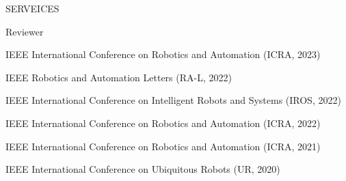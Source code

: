 \begin{rSection}{SERVEICES}{}{}{}        
    \begin{rSubsection}{Reviewer}{}{}{}                
        \item IEEE International Conference on Robotics and Automation (ICRA, 2023)
        \item IEEE Robotics and Automation Letters (RA-L, 2022)
        \item IEEE International Conference on Intelligent Robots and Systems (IROS, 2022)
        \item IEEE International Conference on Robotics and Automation (ICRA, 2022)
        \item IEEE International Conference on Robotics and Automation (ICRA, 2021)
        \item IEEE International Conference on Ubiquitous Robots (UR, 2020)
     \end{rSubsection}  
 \end{rSection}

